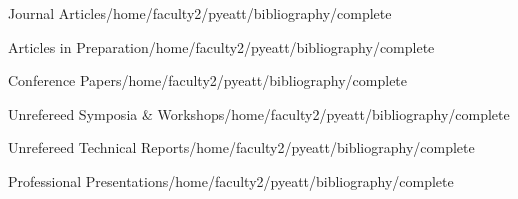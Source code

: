 \documentclass[11pt]{resume}
\begin{document}

\newcommand{\bibfile}{/home/faculty2/pyeatt/bibliography/complete}



\begin{citations}{Journal Articles}{\bibfile}
\nocite{Pyeatt:Howe:J00}
\end{citations}

\begin{citations}{Articles in Preparation}{\bibfile}
\nocite{Pyeatt:J03}
\nocite{Pyeatt:Ellore:J03}
\nocite{Pyeatt:Bansal:J03}
\nocite{Pyeatt:Kona:J03}
\end{citations}

\begin{citations}{Conference Papers}{\bibfile}
\nocite{pyeatt2003a}
\nocite{quasny2003a}
\nocite{Moore:Quasny:Pyeatt:Sinzinger:C01b}
\nocite{Pyeatt:Howe:C01a}
\nocite{Pyeatt:Howe:C99c}
\nocite{Pyeatt:Howe:C99a}
\nocite{Pyeatt:Howe:C98b}
\nocite{Pyeatt:Howe:C98a}
\nocite{Howe:Pyeatt:C96}
\nocite{Gruau:Whitley:Pyeatt:C96}
\nocite{Whitley:Gruau:Pyeatt:C95}
\nocite{Whitley:Mathias:Pyeatt:C95}
\nocite{Pyeatt:Oldham:C91}
\end{citations}


 


\begin{citations}{Unrefereed Symposia \&
Workshops}{\bibfile}
\nocite{Pyeatt:Howe:WS99a}
\nocite{Pyeatt:Howe:FS98}
\end{citations}

\begin{citations}{Unrefereed Technical Reports}{\bibfile}
\nocite{Stevens:Pyeatt:Houlton:Goss:95}
\nocite{Pyeatt:Howe:TR98c}
\end{citations}

\begin{citations}{Professional
Presentations}{\bibfile}
\nocite{Present02a}
\nocite{Present01b}
\nocite{Present01a}
\nocite{Present00a}
\nocite{Present99c}
\nocite{Present99b}
\nocite{Present99a}
\nocite{Present98c}
\nocite{Present98b}
\nocite{Present98a}
\nocite{Present97}
\nocite{Present96}
\nocite{Present91}
\end{citations}
\end{document}
